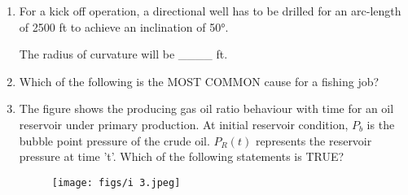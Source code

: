 \documentclass[journal]{IEEEtran}
\begin{document}
\begin{enumerate}
    \hfill{}
    
    \item For a kick off operation, a directional well has to be drilled for an arc-length of 2500 ft to achieve an inclination of 50°.
    
    The radius of curvature will be \_\_\_\_ ft.
    
    \hfill{}
    
    \item Which of the following is the MOST COMMON cause for a fishing job?
    
    \begin{enumerate}  \end{enumerate}              
    
    \hfill{}
    
    \item The figure shows the producing gas oil ratio  behaviour with time for an oil reservoir under primary production. At initial reservoir condition, $P_b$ is the bubble point pressure of the crude oil. $P_R(t)$ represents the reservoir pressure at time 't'. Which of the following statements is TRUE?
    \begin{figure}
        \centering
        \texttt{[image: figs/i 3.jpeg]}
        \caption{}
        \label{fig:placeholder}
    \end{figure}
    
    
 
    
    \begin{enumerate}  \end{enumerate}              
    

\end{enumerate}
\end{document}
